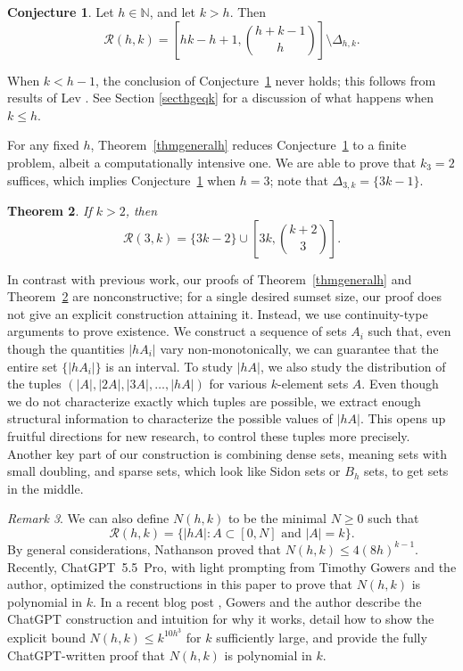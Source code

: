 \documentclass[10pt,a4paper]{article}
\newtheorem{theorem}{Theorem}
\theoremstyle{definition}
\newtheorem{conjecture}[theorem]{Conjecture}
\theoremstyle{remark}
\newtheorem{remark}[theorem]{Remark}
\numberwithin{equation}{section}
\numberwithin{theorem}{section}
\newcommand{\N}{\mathbb{N}}
\newcommand{\calr}{\mathcal{R}}
\begin{document}
\begin{conjecture}\label{mainconj}
Let $h \in \N$, and let $k>h$. Then \[\calr(h,k) = \left[hk-h+1,\binom{h+k-1}{h}\right] \setminus \Delta_{h,k}.\]
\end{conjecture}

When $k < h-1$, the conclusion of Conjecture~\ref{mainconj} never holds; this follows from results of Lev \cite{Lev96}. See Section \ref{secthgeqk} for a discussion of what happens when $k \leq h$.

For any fixed $h$, Theorem~\ref{thmgeneralh} reduces Conjecture~\ref{mainconj} to a finite problem, albeit a computationally intensive one. We are able to prove that $k_3 = 2$ suffices, which implies Conjecture~\ref{mainconj} when $h = 3$; note that $\Delta_{3,k} = \{3k-1\}$.

\begin{theorem}\label{thmh3}
    If $k>2$, then \[\calr(3,k) = \{3k-2\} \cup \left[3k,\binom{k+2}{3}\right].\]
\end{theorem}

In contrast with previous work, our proofs of Theorem~\ref{thmgeneralh} and Theorem~\ref{thmh3} are nonconstructive; for a single desired sumset size, our proof does not give an explicit construction attaining it. Instead, we use continuity-type arguments to prove existence. We construct a sequence of sets $A_i$ such that, even though the quantities $|hA_{i}|$ vary non-monotonically, we can guarantee that the entire set $\{|hA_i|\}$ is an interval. To study $|hA|$, we also study the distribution of the tuples $(|A|, |2A|, |3A|,\ldots,|hA|)$ for various $k$-element sets $A$. Even though we do not characterize exactly which tuples are possible, we extract enough structural information to characterize the possible values of $|hA|$. This opens up fruitful directions for new research, to control these tuples more precisely. Another key part of our construction is combining dense sets, meaning sets with small doubling, and sparse sets, which look like Sidon sets or $B_h$ sets, to get sets in the middle. 

\begin{remark}
    We can also define $N(h,k)$ to be the minimal $N \geq 0$ such that \[\calr(h,k) = \{|hA|:A \subset [0,N] \text{ and }|A| = k\}.\] By general considerations, Nathanson \cite[Theorem 8]{nathanson2025compressioncomplexitysumsetsizes} proved that $N(h,k) \leq 4(8h)^{k-1}$. Recently, \mbox{ChatGPT 5.5 Pro}, with light prompting from Timothy Gowers and the author, optimized the constructions in this paper to prove that $N(h,k)$ is polynomial in $k$. In a recent blog post \cite{GR26}, Gowers and the author describe the ChatGPT construction and intuition for why it works, detail how to show the explicit bound $N(h,k) \leq k^{10h^3}$ for $k$ sufficiently large, and provide the fully ChatGPT-written proof that $N(h,k)$ is polynomial in $k$.
\end{remark}
\end{document}
